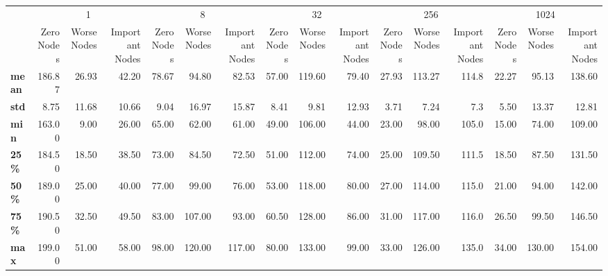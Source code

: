 \begin{tabular}{lrrrrrrrrrrrrrrr}
\toprule
{} & \multicolumn{3}{c}{1} & \multicolumn{3}{c}{8} & \multicolumn{3}{c}{32} & \multicolumn{3}{c}{256} & \multicolumn{3}{c}{1024} \\
{} & Zero Nodes & Worse Nodes & Important Nodes & Zero Nodes & Worse Nodes & Important Nodes & Zero Nodes & Worse Nodes & Important Nodes & Zero Nodes & Worse Nodes & Important Nodes & Zero Nodes & Worse Nodes & Important Nodes \\
\midrule
\textbf{mean} &     186.87 &       26.93 &           42.20 &      78.67 &       94.80 &           82.53 &      57.00 &      119.60 &           79.40 &      27.93 &      113.27 &           114.8 &      22.27 &       95.13 &          138.60 \\
\textbf{std } &       8.75 &       11.68 &           10.66 &       9.04 &       16.97 &           15.87 &       8.41 &        9.81 &           12.93 &       3.71 &        7.24 &             7.3 &       5.50 &       13.37 &           12.81 \\
\textbf{min } &     163.00 &        9.00 &           26.00 &      65.00 &       62.00 &           61.00 &      49.00 &      106.00 &           44.00 &      23.00 &       98.00 &           105.0 &      15.00 &       74.00 &          109.00 \\
\textbf{25\% } &     184.50 &       18.50 &           38.50 &      73.00 &       84.50 &           72.50 &      51.00 &      112.00 &           74.00 &      25.00 &      109.50 &           111.5 &      18.50 &       87.50 &          131.50 \\
\textbf{50\% } &     189.00 &       25.00 &           40.00 &      77.00 &       99.00 &           76.00 &      53.00 &      118.00 &           80.00 &      27.00 &      114.00 &           115.0 &      21.00 &       94.00 &          142.00 \\
\textbf{75\% } &     190.50 &       32.50 &           49.50 &      83.00 &      107.00 &           93.00 &      60.50 &      128.00 &           86.00 &      31.00 &      117.00 &           116.0 &      26.50 &       99.50 &          146.50 \\
\textbf{max } &     199.00 &       51.00 &           58.00 &      98.00 &      120.00 &          117.00 &      80.00 &      133.00 &           99.00 &      33.00 &      126.00 &           135.0 &      34.00 &      130.00 &          154.00 \\
\bottomrule
\end{tabular}

